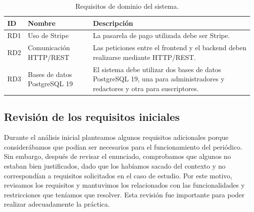 \begin{table}[H]
\centering
\caption{Requisitos de dominio del sistema.}
\label{tab:requisitos-dominio}
\small
\begin{tabularx}{\textwidth}{@{}p{}p{}X@{}}
\toprule
\textbf{ID} & \textbf{Nombre} & \textbf{Descripción} \\
\midrule
RD1 & Uso de Stripe & La pasarela de pago utilizada debe ser Stripe. \\
RD2 & Comunicación HTTP/REST & Las peticiones entre el frontend y el backend deben realizarse mediante HTTP/REST. \\
RD3 & Bases de datos PostgreSQL 19 & El sistema debe utilizar dos bases de datos PostgreSQL 19, una para administradores y redactores y otra para suscriptores. \\
\bottomrule
\end{tabularx}
\end{table}

\subsection{Revisión de los requisitos iniciales}

Durante el análisis inicial planteamos algunos requisitos adicionales porque considerábamos que podían ser necesarios para el funcionamiento del periódico. Sin embargo, después de revisar el enunciado, comprobamos que algunos no estaban bien justificados, dado que los habíamos sacado del contexto y no correspondían a requisitos solicitados en el caso de estudio. Por este motivo, revisamos los requisitos y mantuvimos los relacionados con las funcionalidades y restricciones que teníamos que resolver. Esta revisión fue importante para poder realizar adecuadamente la práctica.
